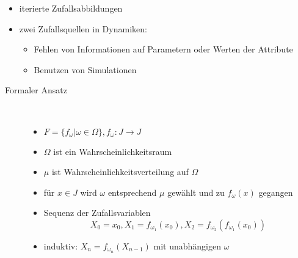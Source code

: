 \begin{itemize}
	\item iterierte Zufallsabbildungen
	\item zwei Zufallsquellen in Dynamiken:
		\begin{itemize}
			\item Fehlen von Informationen auf Parametern oder Werten der Attribute
			\item Benutzen von Simulationen
		\end{itemize}
\end{itemize}
\begin{description}
	\item[Formaler Ansatz] \ \\\vspace*{-\baselineskip}
		\begin{itemize}
			\item $F=\{f_\omega|\omega\in\Omega\}, f_\omega:J\rightarrow J$
			\item $\Omega$ ist ein Wahrscheinlichkeitsraum
			\item $\mu$ ist Wahrscheinlichkeitsverteilung auf $\Omega$
			\item für $x\in J $ wird $\omega$ entsprechend $\mu$ gewählt und zu $f_\omega(x)$ gegangen
			\item Sequenz der Zufallsvariablen
				\[X_0=x_0, X_1=f_{\omega_1}(x_0), X_2=f_{\omega_2}(f_{\omega_1}(x_0))\]
			\item induktiv: $X_n=f_{\omega_n}(X_{n-1})$ mit unabhängigen $\omega$
		\end{itemize}
\end{description}

